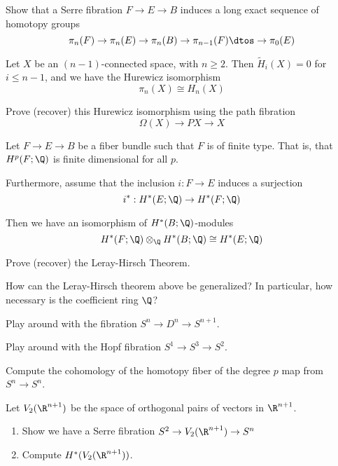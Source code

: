 \begin{xca}
Show that a Serre fibration $F \to E \to B$ induces a long exact sequence of homotopy groups $$\pi_n(F) \to \pi_n(E) \to \pi_n(B) \to \pi_{n-1}(F) \dtos \to \pi_0(E)$$
\end{xca}

\begin{xca}
	\begin{theorem}[Hurewicz]
	
	Let $X$ be an $(n-1)$-connected space, with $n \geq 2$.  Then $\tilde{H}_i(X) = 0$ for $i \leq n-1$, and we have the Hurewicz isomorphism $$\pi_n(X) \cong H_n(X)$$
	
\end{theorem}
	
	Prove (recover) this Hurewicz isomorphism using the path fibration $$\Omega(X) \to PX \to X$$
\end{xca}

\begin{xca}
	\begin{theorem}
		
		Let $F \to E \to B$ be a fiber bundle such that $F$ is of finite type.  That is, that $H^p(F;\Q)$ is finite dimensional for all $p$.
		
		Furthermore, assume that the inclusion $i: F \to E$ induces a surjection $$i^*: H^*(E;\Q) \to H^*(F;\Q)$$
		
		Then we have an isomorphism of $H^*(B;\Q)$-modules $$H^*(F;\Q) \otimes_\Q H^*(B;\Q) \cong H^*(E; \Q)$$
		
	\end{theorem}
	
	Prove (recover) the Leray-Hirsch Theorem.
\end{xca}

\begin{xca}
	How can the Leray-Hirsch theorem above be generalized? In particular, how necessary is the coefficient ring $\Q$?
\end{xca}

\begin{xca}
	Play around with the fibration $S^n \to D^n \to S^{n+1}$.
\end{xca}

\begin{xca}
	Play around with the Hopf fibration $S^1 \to S^3 \to S^2$.
\end{xca}

\begin{xca}
	Compute the cohomology of the homotopy fiber of the degree $p$ map from $S^n \to S^n$.
\end{xca}

\begin{xca}
	Let $V_2(\R^{n+1})$ be the space of orthogonal pairs of vectors in $\R^{n+1}$.
	
	
	\begin{enumerate}
		\item Show we have a Serre fibration $S^2 \to V_2(\R^{n+1}) \to S^n$
		\item Compute $H^*(V_2(\R^{n+1}))$.
	\end{enumerate}
	
\end{xca}